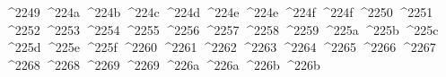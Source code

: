{  ^^^^2249%
  ^^^^224a%
  ^^^^224b%
  ^^^^224c%
  ^^^^224d%
  ^^^^224e%
  ^^^^224e%
  ^^^^224f%
  ^^^^224f%
  ^^^^2250%
  ^^^^2251%
  ^^^^2252%
  ^^^^2253%
  ^^^^2254%
  ^^^^2255%
  ^^^^2256%
  ^^^^2257%
  ^^^^2258%
  ^^^^2259%
  ^^^^225a%
  ^^^^225b%
  ^^^^225c%
  ^^^^225d%
  ^^^^225e%
  ^^^^225f%
  ^^^^2260%
  ^^^^2261%
  ^^^^2262%
  ^^^^2263%
  ^^^^2264%
  ^^^^2265%
  ^^^^2266%
  ^^^^2267%
  ^^^^2268%
  ^^^^2268%
  ^^^^2269%
  ^^^^2269%
  ^^^^226a%
  ^^^^226a%
  ^^^^226b%
  ^^^^226b%
}
